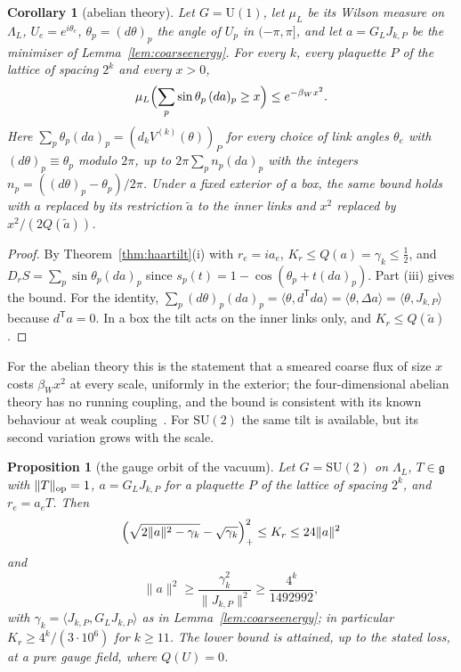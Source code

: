 \documentclass[11pt]{amsart}
\newtheorem{proposition}[theorem]{Proposition}
\newtheorem{corollary}[theorem]{Corollary}
\theoremstyle{definition}
\theoremstyle{remark}
\numberwithin{equation}{section}
\newcommand{\SU}{\mathrm{SU}}
\newcommand{\U}{\mathrm{U}}
\newcommand{\g}{\mathfrak{g}}
\newcommand{\ip}[2]{\langle #1,#2\rangle}
\begin{document}
\begin{corollary}[abelian theory]\label{cor:abeliancoarse}
Let $G=\U(1)$, let $\mu_L$ be its Wilson measure on $\Lambda_L$,
$U_e=e^{i\theta_e}$, $\theta_p=(d\theta)_p$ the angle of
$U_p$ in $(-\pi,\pi]$, and let $a=G_LJ_{k,P}$ be the minimiser of
Lemma~\ref{lem:coarseenergy}. For every $k$, every plaquette $P$ of the
lattice of spacing $2^k$ and every $x>0$,
\[
\mu_L\Bigl(\sum_p\sin\theta_p\,(da)_p\ge x\Bigr)\le e^{-\beta_Wx^2}.
\]
Here $\sum_p\theta_p(da)_p=(d_kV^{(k)}(\theta))_P$ for every choice of
link angles $\theta_e$ with $(d\theta)_p\equiv\theta_p$ modulo $2\pi$, up
to $2\pi\sum_pn_p(da)_p$ with the integers $n_p=((d\theta)_p-\theta_p)/2\pi$.
Under a fixed exterior of a box, the same bound holds with $a$ replaced by
its restriction $\tilde a$ to the inner links and $x^2$ replaced by
$x^2/(2Q(\tilde a))$.
\end{corollary}

\begin{proof}
By Theorem~\ref{thm:haartilt}(i) with $r_e=ia_e$, $K_r\le Q(a)=\gamma_k\le
\frac12$, and $D_rS=\sum_p\sin\theta_p(da)_p$ since $s_p(t)=1-\cos(\theta_p
+t(da)_p)$. Part (iii) gives the bound. For the identity,
$\sum_p(d\theta)_p(da)_p=\ip{\theta}{d^{\mathsf T}da}=\ip{\theta}{\Delta a}
=\ip{\theta}{J_{k,P}}$ because $d^{\mathsf T}a=0$. In a box the tilt acts
on the inner links only, and $K_r\le Q(\tilde a)$.
\end{proof}

For the abelian theory this is the statement that a smeared coarse flux of
size $x$ costs $\beta_Wx^2$ at every scale, uniformly in the exterior; the
four-dimensional abelian theory has no running coupling, and the bound is
consistent with its known behaviour at weak coupling~\cite{Gut80,FS82}. For
$\SU(2)$ the same tilt is available, but its second variation grows with
the scale.

\begin{proposition}[the gauge orbit of the vacuum]\label{prop:tiltgrowth}
Let $G=\SU(2)$ on $\Lambda_L$, $T\in\g$ with $\|T\|_{\rm op}=1$, $a=G_LJ_{
k,P}$ for a plaquette $P$ of the lattice of spacing $2^k$, and $r_e=a_eT$.
Then
\[
\Bigl(\sqrt{2\|a\|^2-\gamma_k}-\sqrt{\gamma_k}\Bigr)_+^2\le K_r\le24\|a\|^2
\]
and
\[
\|a\|^2\ge\frac{\gamma_k^2}{\|J_{k,P}\|^2}\ge\frac{4^k}{1492992},
\]
with $\gamma_k=\ip{J_{k,P}}{G_LJ_{k,P}}$ as in Lemma~\ref{lem:coarseenergy};
in particular $K_r\ge4^k/(3\cdot10^6)$ for $k\ge11$. The lower bound is attained,
up to the stated loss, at a pure gauge field, where $Q(U)=0$.
\end{proposition}
\end{document}
